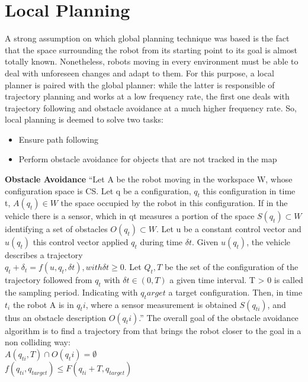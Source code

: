 \section{Local Planning}
A strong assumption on which global planning technique was based is the fact that the space surrounding the robot from its starting point to its goal is almost totally known. Nonetheless, robots moving in every environment must be able to deal with unforeseen changes and adapt to them. For this purpose, a local planner is paired with the global planner: while the latter is responsible of trajectory planning and  works at a low frequency rate, the first one deals with trajectory following and obstacle avoidance at a much higher frequency rate.
So, local planning is deemed to solve two tasks:
\begin{itemize}
    \item Ensure path following
    \item Perform obstacle avoidance for objects that are not tracked in the map
\end{itemize}
\textbf{Obstacle Avoidance}
“Let A be the robot moving in the workspace W, whose configuration space is CS. Let
q be a configuration, $q_{t}$ this configuration in time t, $A(q_{t}) \in W$ the space occupied by the robot in this configuration.
If in the vehicle there is a sensor, which in qt measures a portion of the space $S(q_{t}) \subset W$ identifying a set of obstacles $O(q_{t}) \subset W$. Let u be a constant control vector and $u(q_{t})$
this control vector applied $q_{t}$ during time $\delta t$. Given $u(q_{t})$, the vehicle describes a trajectory \\
$q_t + \delta_t = f(u, q_t, \delta t), with \delta t \geq 0$.
Let $Q_t,T$ be the set of the configuration of the trajectory followed from $q_t$ with $\delta t \in (0,T)$ a given time interval. T > 0 is called the sampling period. Indicating with $q_target$ a target configuration. Then, in time $t_i$ the robot A is in $q_ti$, where a sensor measurement is obtained $S(q_{ti})$, and thus an obstacle description $O(q_ti)$.” \citet{SicilianoKhatib2008}
The overall goal of the obstacle avoidance algorithm is to find a trajectory from that brings the robot closer to the goal in a non colliding way:\\
$A(q_{ti}, T) \cap O(q_ti) = \emptyset$ \\
$f(q_{ti}, q_{target}) \le F(q_{ti} + T, q_{target})$\\
